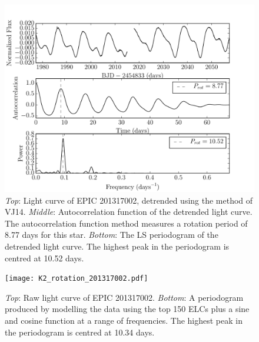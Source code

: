 \documentclass[useAMS, usenatbib, preprint, 12pt]{aastex}
\begin{document}
\begin{figure}
\begin{center}
\includegraphics[width=6in, clip=true]{rotation_poster_child.pdf}
\caption{{\it Top}: Light curve of EPIC 201317002, detrended using the method
of VJ14. {\it Middle}: Autocorrelation function of the
detrended light curve. The autocorrelation function method measures a rotation
period of 8.77 days for this star. {\it Bottom}: The LS periodogram
of the detrended light curve. The highest peak in the periodogram is centred at
10.52 days.}
\label{fig:rotation_poster_child}
\end{center}
\end{figure}

\begin{figure}
\begin{center}
\texttt{[image: K2\_rotation\_201317002.pdf]}
\caption{{\it Top}: Raw light curve of EPIC 201317002. {\it Bottom}: A
periodogram produced by modelling the data using the top 150 ELCs
plus a sine and cosine function at a range of frequencies. The highest peak in
the periodogram is centred at 10.34 days.}
\label{fig:K2_rotation_poster_child}
\end{center}
\end{figure}
\end{document}

